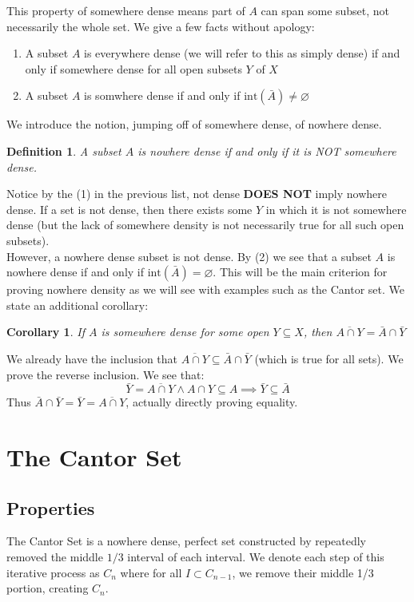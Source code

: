 \documentclass[10pt,letterpaper]{article} %
\newtheorem{defn}{Definition}[section]
\newtheorem{cor}{Corollary}[section]
\begin{document}
This property of somewhere dense means part of $A$ can span some subset, not necessarily the whole set. We give a few facts without apology:
\begin{enumerate}
  \item A subset $A$ is everywhere dense (we will refer to this as simply dense) if and only if somewhere dense for all open subsets $Y$ of $X$
  \item A subset $A$ is somwhere dense if and only if $\text{int}(\bar{A}) \neq \varnothing$
\end{enumerate}
We introduce the notion, jumping off of somewhere dense, of nowhere dense.
\begin{defn}
A subset $A$ is nowhere dense if and only if it is NOT somewhere dense.
\end{defn}
Notice by the (1) in the previous list, not dense \textbf{DOES NOT} imply nowhere dense. If a set is not dense, then there exists some $Y$ in which it is not somewhere dense (but the lack of somewhere density is not necessarily true for all such open subsets).\\

However, a nowhere dense subset is not dense. By (2) we see that a subset $A$ is nowhere dense if and only if $\text{int}(\bar{A}) = \varnothing$. This will be the main criterion for proving nowhere density as we will see with examples such as the Cantor set. We state an additional corollary:
\begin{cor}
If $A$ is somewhere dense for some open $Y \subseteq X$, then $\overline{A \cap Y} = \bar{A} \cap \bar{Y}$
\end{cor}
We already have the inclusion that $\overline{A \cap Y} \subseteq \bar{A} \cap \bar{Y}$ (which is true for all sets). We prove the reverse inclusion. We see that:
\begin{equation*}
  \bar{Y} = \overline{A \cap Y} \land A \cap Y \subseteq A \implies \bar{Y} \subseteq \bar{A} 
\end{equation*}
Thus $\bar{A} \cap \bar{Y} = \bar{Y} = \overline{A \cap Y}$, actually directly proving equality.

\pagebreak
\section{The Cantor Set}

\subsection{Properties}
The Cantor Set is a nowhere dense, perfect set constructed by repeatedly removed the middle $1/3$ interval of each interval. We denote each step of this iterative process as $C_n$ where for all $I \subset C_{n-1}$, we remove their middle 1/3 portion, creating $C_n$.\\
\end{document}
